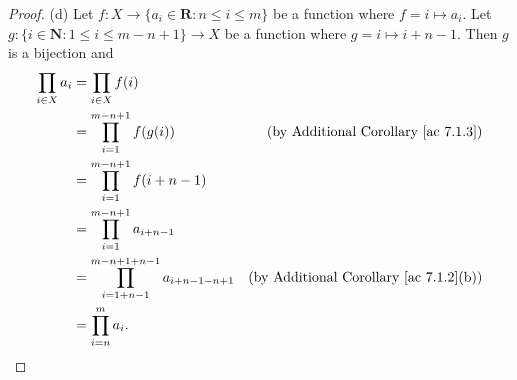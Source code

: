 \begin{proof}{(d)}
    Let \(f : X \to \{a_i \in \mathbf{R} : n \leq i \leq m\}\) be a function where \(f = i \mapsto a_i\).
    Let \(g : \{i \in \mathbf{N} : 1 \leq i \leq m - n + 1\} \to X\) be a function where \(g = i \mapsto i + n - 1\).
    Then \(g\) is a bijection and
    \begin{align*}
        \prod_{i \in X} a_i & = \prod_{i \in X} f(i)                                                                                                 \\
                            & = \prod_{i = 1}^{m - n + 1} f(g(i))                               & \text{(by Additional Corollary \ref{ac 7.1.3})}    \\
                            & = \prod_{i = 1}^{m - n + 1} f(i + n - 1)                                                                               \\
                            & = \prod_{i = 1}^{m - n + 1} a_{i + n - 1}                                                                              \\
                            & = \prod_{i = 1 + n - 1}^{m - n + 1 + n - 1} a_{i + n - 1 - n + 1} & \text{(by Additional Corollary \ref{ac 7.1.2}(b))} \\
                            & = \prod_{i = n}^m a_i.
    \end{align*}
\end{proof}

